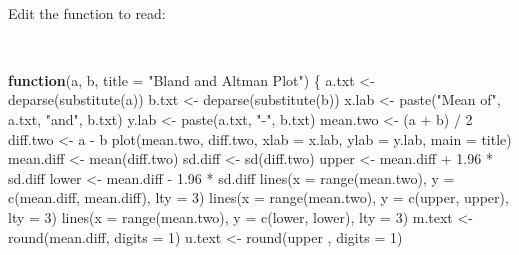 \documentclass[
  12pt,
  a4paper]{book}
\newenvironment{Shaded}{\begin{snugshade}}{\end{snugshade}}
\newcommand{\AttributeTok}[1]{\textcolor[rgb]{0.77,0.63,0.00}{#1}}
\newcommand{\ControlFlowTok}[1]{\textcolor[rgb]{0.13,0.29,0.53}{\textbf{#1}}}
\newcommand{\DecValTok}[1]{\textcolor[rgb]{0.00,0.00,0.81}{#1}}
\newcommand{\FloatTok}[1]{\textcolor[rgb]{0.00,0.00,0.81}{#1}}
\newcommand{\FunctionTok}[1]{\textcolor[rgb]{0.00,0.00,0.00}{#1}}
\newcommand{\NormalTok}[1]{#1}
\newcommand{\OtherTok}[1]{\textcolor[rgb]{0.56,0.35,0.01}{#1}}
\newcommand{\SpecialCharTok}[1]{\textcolor[rgb]{0.00,0.00,0.00}{#1}}
\newcommand{\StringTok}[1]{\textcolor[rgb]{0.31,0.60,0.02}{#1}}
\begin{document}
~

Edit the function to read:

~

\begin{Shaded}
\begin{Highlighting}[]
\ControlFlowTok{function}\NormalTok{(a, b, }\AttributeTok{title =} \StringTok{"Bland and Altman Plot"}\NormalTok{) \{}
\NormalTok{  a.txt }\OtherTok{\textless{}{-}} \FunctionTok{deparse}\NormalTok{(}\FunctionTok{substitute}\NormalTok{(a))}
\NormalTok{  b.txt }\OtherTok{\textless{}{-}} \FunctionTok{deparse}\NormalTok{(}\FunctionTok{substitute}\NormalTok{(b))}
\NormalTok{  x.lab }\OtherTok{\textless{}{-}} \FunctionTok{paste}\NormalTok{(}\StringTok{"Mean of"}\NormalTok{, a.txt, }\StringTok{"and"}\NormalTok{, b.txt)}
\NormalTok{  y.lab }\OtherTok{\textless{}{-}} \FunctionTok{paste}\NormalTok{(a.txt, }\StringTok{"{-}"}\NormalTok{, b.txt)}
\NormalTok{  mean.two }\OtherTok{\textless{}{-}}\NormalTok{ (a }\SpecialCharTok{+}\NormalTok{ b) }\SpecialCharTok{/} \DecValTok{2}
\NormalTok{  diff.two }\OtherTok{\textless{}{-}}\NormalTok{ a }\SpecialCharTok{{-}}\NormalTok{ b}
  \FunctionTok{plot}\NormalTok{(mean.two, diff.two, }\AttributeTok{xlab =}\NormalTok{ x.lab, }\AttributeTok{ylab =}\NormalTok{ y.lab, }\AttributeTok{main =}\NormalTok{ title) }
\NormalTok{  mean.diff }\OtherTok{\textless{}{-}} \FunctionTok{mean}\NormalTok{(diff.two)}
\NormalTok{  sd.diff }\OtherTok{\textless{}{-}} \FunctionTok{sd}\NormalTok{(diff.two)}
\NormalTok{  upper }\OtherTok{\textless{}{-}}\NormalTok{ mean.diff }\SpecialCharTok{+} \FloatTok{1.96} \SpecialCharTok{*}\NormalTok{ sd.diff}
\NormalTok{  lower }\OtherTok{\textless{}{-}}\NormalTok{ mean.diff }\SpecialCharTok{{-}} \FloatTok{1.96} \SpecialCharTok{*}\NormalTok{ sd.diff}
  \FunctionTok{lines}\NormalTok{(}\AttributeTok{x =} \FunctionTok{range}\NormalTok{(mean.two), }\AttributeTok{y =} \FunctionTok{c}\NormalTok{(mean.diff, mean.diff), }\AttributeTok{lty =} \DecValTok{3}\NormalTok{) }
  \FunctionTok{lines}\NormalTok{(}\AttributeTok{x =} \FunctionTok{range}\NormalTok{(mean.two), }\AttributeTok{y =} \FunctionTok{c}\NormalTok{(upper, upper), }\AttributeTok{lty =} \DecValTok{3}\NormalTok{)}
  \FunctionTok{lines}\NormalTok{(}\AttributeTok{x =} \FunctionTok{range}\NormalTok{(mean.two), }\AttributeTok{y =} \FunctionTok{c}\NormalTok{(lower, lower), }\AttributeTok{lty =} \DecValTok{3}\NormalTok{)}
\NormalTok{  m.text }\OtherTok{\textless{}{-}} \FunctionTok{round}\NormalTok{(mean.diff, }\AttributeTok{digits =} \DecValTok{1}\NormalTok{)}
\NormalTok{  u.text }\OtherTok{\textless{}{-}} \FunctionTok{round}\NormalTok{(upper , }\AttributeTok{digits =} \DecValTok{1}\NormalTok{)}

\end{Highlighting}
\end{Shaded}
\end{document}
